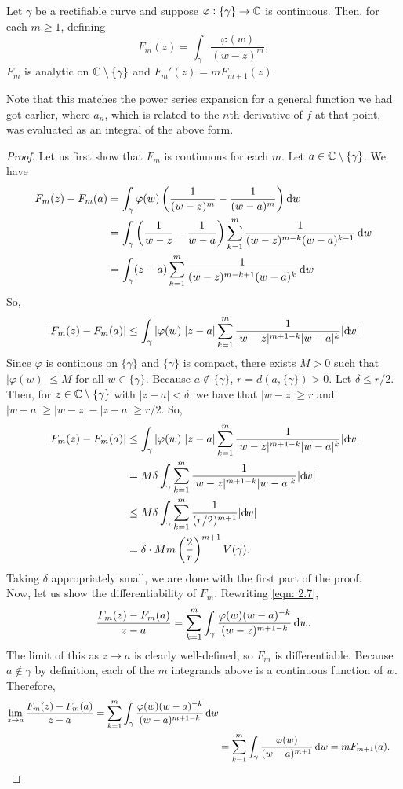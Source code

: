 	\begin{flem}
		Let $\gamma$ be a rectifiable curve and suppose $\varphi : \{\gamma\} \to \mathbb{C}$ is continuous. Then, for each $m \ge 1$, defining
		\[ F_m(z) = \int_\gamma \frac{\varphi(w)}{(w-z)^m}, \]
		$F_m$ is analytic on $\mathbb{C}\setminus\{\gamma\}$ and $F_m'(z) = m F_{m+1}(z)$.
	\end{flem}
	Note that this matches the power series expansion for a general function we had got earlier, where $a_n$, which is related to the $n$th derivative of $f$ at that point, was evaluated as an integral of the above form.
	\begin{proof}
		Let us first show that $F_m$ is continuous for each $m$. Let $a \in \mathbb{C}\setminus\{\gamma\}$. We have
		\begin{align}
			F_m(z) - F_m(a) &= \int_\gamma \varphi(w) \left( \frac{1}{(w-z)^m} - \frac{1}{(w-a)^m} \right) \dif w \nonumber \\
				&= \int_\gamma \left( \frac{1}{w-z} - \frac{1}{w-a} \right) \sum_{k=1}^{m} \frac{1}{(w-z)^{m-k} (w-a)^{k-1}} \dif w \nonumber \\
				&= \int_\gamma (z-a) \sum_{k=1}^{m} \frac{1}{(w-z)^{m-k+1} (w-a)^{k}} \dif w \label{eqn: 2.7}
		\end{align}
		So,
		\[ |F_m(z) - F_m(a)| \le \int_\gamma |\varphi(w)| |z-a| \sum_{k=1}^m \frac{1}{|w-z|^{m+1-k}|w-a|^{k}} |{\dif} {w}| \]
		Since $\varphi$ is continous on $\{\gamma\}$ and $\{\gamma\}$ is compact, there exists $M > 0$ such that $|\varphi(w)| \le M$ for all $w \in \{\gamma\}$. Because $a\not\in\{\gamma\}$, $r = d(a,\{\gamma\}) > 0$. Let $\delta \le r/2$. Then, for $z \in \mathbb{C}\setminus\{\gamma\}$ with $|z-a| < \delta$, we have that $|w-z| \ge r$ and $|w-a| \ge |w-z| - |z-a| \ge r/2$. So,
		\begin{align*}
			|F_m(z) - F_m(a)| &\le \int_\gamma |\varphi(w)| |z-a| \sum_{k=1}^m \frac{1}{|w-z|^{m+1-k}|w-a|^{k}} |{\dif} {w}| \\
				&= M\delta \int_\gamma \sum_{k=1}^m \frac{1}{|w-z|^{m+1-k}|w-a|^{k}} |{\dif} {w}| \\
				&\le M\delta \int_\gamma \sum_{k=1}^m \frac{1}{(r/2)^{m+1}} |{\dif}{w}| \\
				&= \delta \cdot Mm \left(\frac{2}{r}\right)^{m+1} V(\gamma).
		\end{align*}
		Taking $\delta$ appropriately small, we are done with the first part of the proof.\\
		Now, let us show the differentiability of $F_m$. Rewriting \eqref{eqn: 2.7},
		\[ \frac{F_m(z) - F_m(a)}{z-a} = \sum_{k=1}^m \int_\gamma \frac{\varphi(w)(w-a)^{-k}}{(w-z)^{m+1-k}} \dif w. \]
		The limit of this as $z\to a$ is clearly well-defined, so $F_m$ is differentiable. Because $a\not\in\gamma$ by definition, each of the $m$ integrands above is a continuous function of $w$.\\
		Therefore,
		\begin{align*}
			\lim_{z\to a} \frac{F_m(z) - F_m(a)}{z-a} = \sum_{k=1}^m \int_\gamma \frac{\varphi(w)(w-a)^{-k}}{(w-a)^{m+1-k}} \dif w \\
				&= \sum_{k=1}^m \int_\gamma \frac{\varphi(w)}{(w-a)^{m+1}} \dif w = m F_{m+1}(a). \qedhere
		\end{align*}
	\end{proof}

